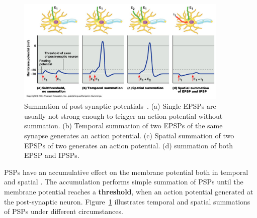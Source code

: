 


\begin{figure}[bt!]
	\centering
	\includegraphics[width=0.9\textwidth]{pics_snn/psp.png}
	\caption{Summation of post-synaptic potentials~\citep{reece2011campbell}. 
		(a) Single EPSPs are usually not strong enough to trigger an action potential without summation. (b) Temporal summation of two EPSPs of the same synapse generates an action potential. (c) Spatial summation of two EPSPs of two \DIFdelbeginFL {}\DIFdelendFL \DIFaddbeginFL {}\DIFaddendFL generates an action potential. (d) \DIFdelbeginFL {}\DIFdelendFL \DIFaddbeginFL {}\DIFaddendFL summation of both EPSP and IPSPs.
	}
	\label{Fig:psp_sum}
\end{figure}

\DIFdelbegin {}\DIFdelend \DIFaddbegin {}\DIFaddend PSPs have an accumulative effect on the membrane potential both in temporal and spatial \DIFaddbegin {}\DIFaddend .
The accumulation performs \DIFaddbegin {}\DIFaddend simple summation of PSPs until the membrane potential reaches a \textbf{threshold}, when an action potential \DIFdelbegin {}\DIFdelend \DIFaddbegin {}\DIFaddend generated at the post-synaptic neuron.
Figure~\ref{Fig:psp_sum} illustrates temporal and spatial summations of PSPs under different circumstances.
\DIFaddbegin {}\DIFaddend 


